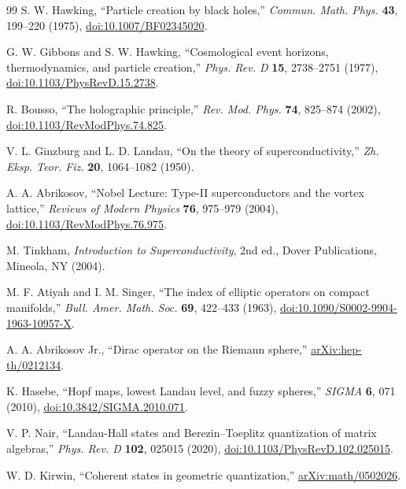 \documentclass[aps,prd,reprint,nofootinbib,superscriptaddress,floatfix]{revtex4-2}
\numberwithin{equation}{section}
\theoremstyle{definition}
\theoremstyle{plain}
\begin{document}
\begin{thebibliography}{99}
S. W. Hawking,
``Particle creation by black holes,''
\emph{Commun. Math. Phys.} \textbf{43}, 199--220 (1975),
\href{https://doi.org/10.1007/BF02345020}{doi:10.1007/BF02345020}.

G. W. Gibbons and S. W. Hawking,
``Cosmological event horizons, thermodynamics, and particle creation,''
\emph{Phys. Rev. D} \textbf{15}, 2738--2751 (1977),
\href{https://doi.org/10.1103/PhysRevD.15.2738}{doi:10.1103/PhysRevD.15.2738}.


R. Bousso,
``The holographic principle,''
\emph{Rev. Mod. Phys.} \textbf{74}, 825--874 (2002),
\href{https://doi.org/10.1103/RevModPhys.74.825}{doi:10.1103/RevModPhys.74.825}.



V. L. Ginzburg and L. D. Landau,
``On the theory of superconductivity,''
\emph{Zh. Eksp. Teor. Fiz.} \textbf{20}, 1064--1082 (1950).

A. A. Abrikosov,
``Nobel Lecture: Type-II superconductors and the vortex lattice,''
\emph{Reviews of Modern Physics} \textbf{76}, 975--979 (2004),
\href{https://doi.org/10.1103/RevModPhys.76.975}{doi:10.1103/RevModPhys.76.975}.

M. Tinkham,
\emph{Introduction to Superconductivity}, 2nd ed.,
Dover Publications, Mineola, NY (2004).

M. F. Atiyah and I. M. Singer,
``The index of elliptic operators on compact manifolds,''
\emph{Bull. Amer. Math. Soc.} \textbf{69}, 422--433 (1963),
\href{https://doi.org/10.1090/S0002-9904-1963-10957-X}{doi:10.1090/S0002-9904-1963-10957-X}.

A. A. Abrikosov Jr.,
``Dirac operator on the Riemann sphere,''
\href{https://arxiv.org/abs/hep-th/0212134}{arXiv:hep-th/0212134}.

K. Hasebe,
``Hopf maps, lowest Landau level, and fuzzy spheres,''
\emph{SIGMA} \textbf{6}, 071 (2010),
\href{https://doi.org/10.3842/SIGMA.2010.071}{doi:10.3842/SIGMA.2010.071}.


V. P. Nair,
``Landau-Hall states and Berezin--Toeplitz quantization of matrix algebras,''
\emph{Phys. Rev. D} \textbf{102}, 025015 (2020),
\href{https://doi.org/10.1103/PhysRevD.102.025015}{doi:10.1103/PhysRevD.102.025015}.

W. D. Kirwin,
``Coherent states in geometric quantization,''
\href{https://arxiv.org/abs/math/0502026}{arXiv:math/0502026}.


\end{thebibliography}
\end{document}
